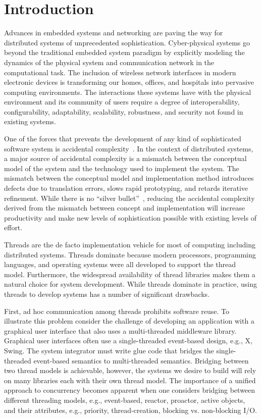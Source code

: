 \documentclass[letterpaper]{article}
\begin{document}
\section{Introduction}

Advances in embedded systems and networking are paving the way for distributed systems of unprecedented sophistication.
Cyber-physical systems go beyond the traditional embedded system paradigm by explicitly modeling the dynamics of the physical system and communication network in the computational task.
The inclusion of wireless network interfaces in modern electronic devices is transforming our homes, offices, and hospitals into pervasive computing environments.
The interactions these systems have with the physical environment and its community of users require a degree of interoperability, configurability, adaptability, scalability, robustness, and security not found in existing systems.

One of the forces that prevents the development of any kind of sophisticated software system is accidental complexity~\cite{brooks_nsb}.
In the context of distributed systems, a major source of accidental complexity is a mismatch between the conceptual model of the system and the technology used to implement the system.
The mismatch between the conceptual model and implementation method introduces defects due to translation errors, slows rapid prototyping, and retards iterative refinement.
While there is no ``silver bullet''~\cite{brooks_nsb}, reducing the accidental complexity derived from the mismatch between concept and implementation will increase productivity and make new levels of sophistication possible with existing levels of effort.

Threads are the de facto implementation vehicle for most of computing including distributed systems.
Threads dominate because modern processors, programming languages, and operating systems were all developed to support the thread model.
Furthermore, the widespread availability of thread libraries makes them a natural choice for system development.
While threads dominate in practice, using threads to develop systems has a number of significant drawbacks.

First, ad hoc communication among threads prohibits software reuse.
To illustrate this problem consider the challenge of developing an application with a graphical user interface that also uses a multi-threaded middleware library.
Graphical user interfaces often use a single-threaded event-based design, e.g., X, Swing.
The system integrator must write glue code that bridges the single-threaded event-based semantics to multi-threaded semantics.
Bridging between two thread models is achievable, however, the systems we desire to build will rely on many libraries each with their own thread model.
The importance of a unified approach to concurrency becomes apparent when one considers bridging between different threading models, e.g., event-based, reactor, proactor, active objects, and their attributes, e.g., priority, thread-creation, blocking vs. non-blocking I/O.
\end{document}
